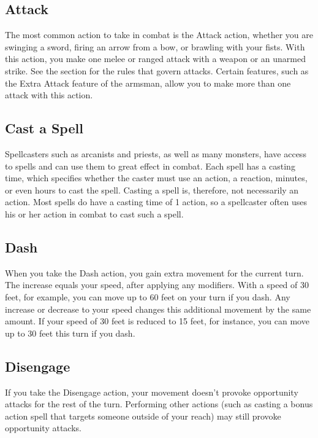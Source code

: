 \subsection{Attack}

The most common action to take in combat is the Attack action, whether you are swinging a sword, firing an arrow from a bow, or brawling with your fists. With this action, you make one melee or ranged attack with a weapon or an unarmed strike. See the  section for the rules that govern attacks. Certain features, such as the Extra Attack feature of the armsman, allow you to make more than one attack with this action.

\subsection{Cast a Spell}

Spellcasters such as arcanists and priests, as well as many monsters, have access to spells and can use them to great effect in combat. Each spell has a casting time, which specifies whether the caster must use an action, a reaction, minutes, or even hours to cast the spell. Casting a spell is, therefore, not necessarily an action. Most spells do have a casting time of 1 action, so a spellcaster often uses his or her action in combat to cast such a spell.

\subsection{Dash}

When you take the Dash action, you gain extra movement for the current turn. The increase equals your speed, after applying any modifiers. With a speed of 30 feet, for example, you can move up to 60 feet on your turn if you dash. Any increase or decrease to your speed changes this additional movement by the same amount. If your speed of 30 feet is reduced to 15 feet, for instance, you can move up to 30 feet this turn if you dash.

\subsection{Disengage}

If you take the Disengage action, your movement doesn't provoke opportunity attacks for the rest of the turn. Performing other actions (such as casting a bonus action spell that targets someone outside of your reach) may still provoke opportunity attacks.


